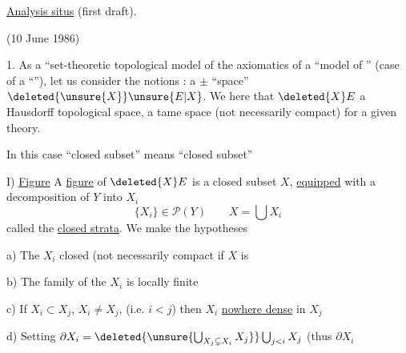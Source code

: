 \uline{Analysis situs} (first draft).

(10 June 1986)

1. As a ``set-theoretic topological model of the axiomatics of a ``model of  '' (case of a ``\uline{}''),
let us consider the  notions  : a $\pm$  ``space'' $\deleted{\unsure{X}}\unsure{E|X}$.
We  here that $\deleted{X}E$  a Hausdorff topological space,  a tame space (not necessarily compact) for a given  theory.

In this case ``closed subset'' means ``closed  subset''

I) \uline{Figure} \qquad A \uline{figure}  of $\deleted{X}E$ is a closed subset $X$, \uline{equipped} with a
decomposition of $Y$ into   $X_i$
\[
\{X_i\}\in\mathcal{P}(Y) \qquad X=\bigcup X_i
\]
called the \uline{closed strata}. We make the hypotheses

a) The $X_i$ closed  (not necessarily compact \unsure{\}}   if $X$ is\unsure{)}

b) The family of the $X_i$ is locally finite

c) If   $X_i\subset X_j$, $X_i\ne X_j$, (i.e. $i<j$) then $X_i$ \uline{nowhere dense} in $X_j$

d) Setting $\partial X_i=\deleted{\unsure{\bigcup_{X_j\subsetneq X_i}X_j}}\bigcup_{j<i}X_j$ (thus $\partial X_i$
